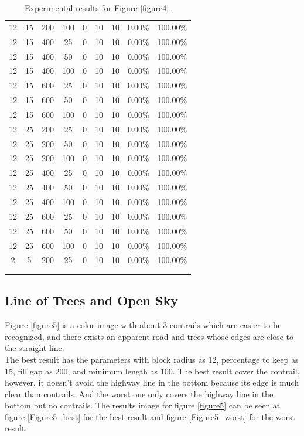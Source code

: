 {\begin{longtable}{| c | c | c | c | c | c | c | c | c |}
12&15&200&100&0&10&10&0.00\%&100.00\%\\
12&15&400&25&0&10&10&0.00\%&100.00\%\\
12&15&400&50&0&10&10&0.00\%&100.00\%\\
12&15&400&100&0&10&10&0.00\%&100.00\%\\
12&15&600&25&0&10&10&0.00\%&100.00\%\\
12&15&600&50&0&10&10&0.00\%&100.00\%\\
12&15&600&100&0&10&10&0.00\%&100.00\%\\
12&25&200&25&0&10&10&0.00\%&100.00\%\\
12&25&200&50&0&10&10&0.00\%&100.00\%\\
12&25&200&100&0&10&10&0.00\%&100.00\%\\
12&25&400&25&0&10&10&0.00\%&100.00\%\\
12&25&400&50&0&10&10&0.00\%&100.00\%\\
12&25&400&100&0&10&10&0.00\%&100.00\%\\
12&25&600&25&0&10&10&0.00\%&100.00\%\\
12&25&600&50&0&10&10&0.00\%&100.00\%\\
12&25&600&100&0&10&10&0.00\%&100.00\%\\
2&5&200&25&0&10&10&0.00\%&100.00\%\\ \\\hline
\caption{Experimental results for Figure \ref{figure4}.}
\label{table4}
\end{longtable}
}
\endgroup


\clearpage
\subsection{Line of Trees and Open Sky}

Figure \ref{figure5} is a color image with about 3 contrails which are easier to be recognized, and there exists an apparent road and trees whose edges are close to the straight line.\\
The best result has the parameters with block radius as 12, percentage to keep as 15, fill gap as 200, and minimum length as 100. The best result cover the contrail, however, it doesn’t avoid the highway line in the bottom because its edge is much clear than contrails. And the worst one only covers the highway line in the bottom but no contrails. The results image for figure \ref{figure5} can be seen at figure \ref{Figure5_best} for the best result and figure \ref{Figure5_worst} for the worst result.

